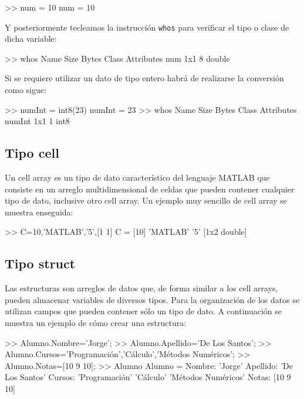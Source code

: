 \begin{matlab}
>> num = 10
num =
    10
\end{matlab}

Y posteriormente tecleamos la instrucción \texttt{whos} para verificar 
el tipo o clase de dicha variable:

\begin{matlab}
>> whos
  Name      Size            Bytes  Class     Attributes
  num       1x1                 8  double   
\end{matlab}

Si se requiere utilizar un dato de tipo entero habrá de realizarse la
conversión como sigue:

\begin{matlab}
>> numInt = int8(23)
numInt =
   23
>> whos
  Name        Size            Bytes  Class    Attributes
  numInt      1x1                 1  int8               
\end{matlab}

\subsection{Tipo cell}

Un cell array es un tipo de dato característico del lenguaje MATLAB que
consiste en un arreglo multidimensional de celdas que pueden contener
cualquier tipo de dato, inclusive otro cell array. Un ejemplo muy
sencillo de cell array se muestra enseguida:

\begin{matlab}
>> C={10,'MATLAB','5',[1 1]}
C = 
    [10]    'MATLAB'    '5'    [1x2 double]
\end{matlab}

\subsection{Tipo struct}\label{tipo-struct}

Las estructuras son arreglos de datos que, de forma similar a los cell
arrays, pueden almacenar variables de diversos tipos. Para la
organización de los datos se utilizan campos que pueden contener sólo un
tipo de dato. A continuación se muestra un ejemplo de cómo crear una
estructura:

\begin{matlab}
>> Alumno.Nombre='Jorge';
>> Alumno.Apellido='De Los Santos';
>> Alumno.Cursos={'Programación','Cálculo','Métodos Numéricos'};
>> Alumno.Notas=[10 9 10];
>> Alumno
Alumno = 
      Nombre: 'Jorge'
    Apellido: 'De Los Santos'
      Cursos: {'Programación'  'Cálculo'  'Métodos Numéricos'}
       Notas: [10 9 10]
\end{matlab}

